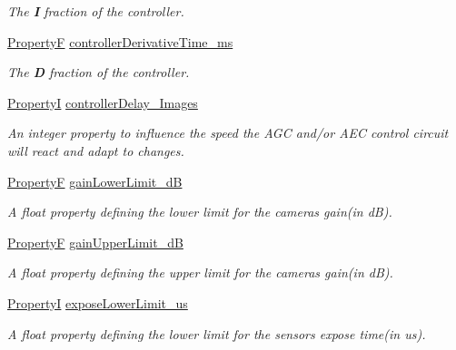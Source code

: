 \begin{DoxyCompactItemize}
\begin{DoxyCompactList}\small\item\em The {\bfseries I} fraction of the controller. \end{DoxyCompactList}\item 
\hyperlink{group___common_interface_gaf54865fe5a3d5cfd15f9a111b40d09f9}{Property\+F} \hyperlink{classmv_i_m_p_a_c_t_1_1acquire_1_1_auto_control_parameters_a84e0732f989407f5895f0aa199ec508f}{controller\+Derivative\+Time\+\_\+ms}
\begin{DoxyCompactList}\small\item\em The {\bfseries D} fraction of the controller. \end{DoxyCompactList}\item 
\hyperlink{group___common_interface_ga12d5e434238ca242a1ba4c6c3ea45780}{Property\+I} \hyperlink{classmv_i_m_p_a_c_t_1_1acquire_1_1_auto_control_parameters_a3407e03e305679114b266795ad777235}{controller\+Delay\+\_\+\+Images}
\begin{DoxyCompactList}\small\item\em An integer property to influence the speed the A\+G\+C and/or A\+E\+C control circuit will react and adapt to changes. \end{DoxyCompactList}\item 
\hyperlink{group___common_interface_gaf54865fe5a3d5cfd15f9a111b40d09f9}{Property\+F} \hyperlink{classmv_i_m_p_a_c_t_1_1acquire_1_1_auto_control_parameters_ad2c4a40a7f4898a6ffda900066e1dd7b}{gain\+Lower\+Limit\+\_\+d\+B}
\begin{DoxyCompactList}\small\item\em A float property defining the lower limit for the cameras gain(in d\+B). \end{DoxyCompactList}\item 
\hyperlink{group___common_interface_gaf54865fe5a3d5cfd15f9a111b40d09f9}{Property\+F} \hyperlink{classmv_i_m_p_a_c_t_1_1acquire_1_1_auto_control_parameters_a876d25d570ecd186687d6a72aea34e54}{gain\+Upper\+Limit\+\_\+d\+B}
\begin{DoxyCompactList}\small\item\em A float property defining the upper limit for the cameras gain(in d\+B). \end{DoxyCompactList}\item 
\hyperlink{group___common_interface_ga12d5e434238ca242a1ba4c6c3ea45780}{Property\+I} \hyperlink{classmv_i_m_p_a_c_t_1_1acquire_1_1_auto_control_parameters_a0735b2bc3ada211f34ff924e2b9123b7}{expose\+Lower\+Limit\+\_\+us}
\begin{DoxyCompactList}\small\item\em A float property defining the lower limit for the sensors expose time(in us). \end{DoxyCompactList}\item 

\end{DoxyCompactItemize}
